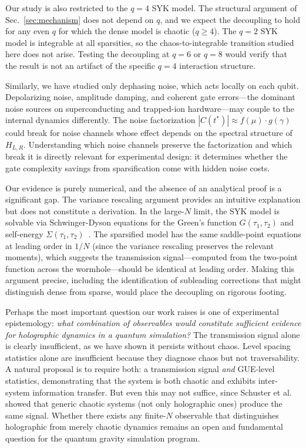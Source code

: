 \documentclass[aps,prd,twocolumn,superscriptaddress,nofootinbib,floatfix]{revtex4-2}
\begin{document}
Our study is also restricted to the $q=4$ SYK model. The structural
argument of Sec.~\ref{sec:mechanism} does not depend on $q$, and we
expect the decoupling to hold for any even $q$ for which the dense
model is chaotic ($q \geq 4$). The $q=2$ SYK model is integrable at
all sparsities, so the chaos-to-integrable transition studied here does
not arise. Testing the decoupling at $q=6$ or $q=8$ would verify that
the result is not an artifact of the specific $q=4$ interaction
structure.

Similarly, we have studied only dephasing noise, which acts locally on
each qubit. Depolarizing noise, amplitude damping, and coherent gate
errors---the dominant noise sources on superconducting and trapped-ion
hardware---may couple to the internal dynamics differently. The noise
factorization $|C(t^*)| \approx f(\mu) \cdot g(\gamma)$ could break
for noise channels whose effect depends on the spectral structure of
$H_{L,R}$. Understanding which noise channels preserve the factorization
and which break it is directly relevant for experimental design: it
determines whether the gate complexity savings from sparsification come
with hidden noise costs.

Our evidence is purely numerical, and the absence of an analytical proof
is a significant gap. The variance rescaling argument provides an
intuitive explanation but does not constitute a derivation. In the
large-$N$ limit, the SYK model is solvable via Schwinger-Dyson equations
for the Green's function $G(\tau_1,\tau_2)$ and self-energy
$\Sigma(\tau_1,\tau_2)$~\cite{Maldacena:2016hyu}. The sparsified model
has the same saddle-point equations at leading order in $1/N$ (since the
variance rescaling preserves the relevant moments), which suggests the
transmission signal---computed from the two-point function across the
wormhole---should be identical at leading order. Making this argument
precise, including the identification of subleading corrections that
might distinguish dense from sparse, would place the decoupling on
rigorous footing.

Perhaps the most important question our work raises is one of experimental
epistemology: \textit{what combination of observables would constitute
sufficient evidence for holographic dynamics in a quantum simulation?}
The transmission signal alone is clearly insufficient, as we have shown
it persists without chaos. Level spacing statistics alone are insufficient
because they diagnose chaos but not traversability. A natural proposal is
to require both: a transmission signal \textit{and} GUE-level statistics,
demonstrating that the system is both chaotic and exhibits inter-system
information transfer. But even this may not suffice, since Schuster et
al.~\cite{Schuster:2021uvg} showed that generic chaotic systems (not only
holographic ones) produce the same signal. Whether there exists any
finite-$N$ observable that distinguishes holographic from merely chaotic
dynamics remains an open and fundamental question for the quantum gravity
simulation program.
\end{document}
